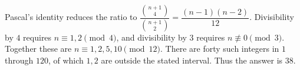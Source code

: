 Pascal's identity reduces the ratio to $\dfrac{\binom{n+1}{4}}{\binom{n+1}{2}}=\dfrac{(n-1)(n-2)}{12}$. Divisibility by $4$ requires $n\equiv1,2\pmod4$, and divisibility by $3$ requires $n\not\equiv0\pmod3$. Together these are $n\equiv1,2,5,10\pmod{12}$. There are forty such integers in $1$ through $120$, of which $1,2$ are outside the stated interval. Thus the answer is $\boxed{38}$.
